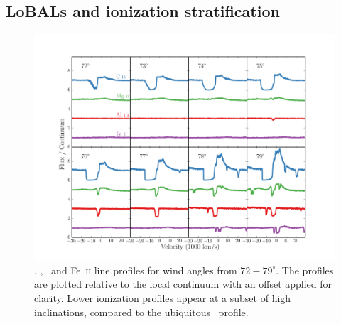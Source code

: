 \documentclass[useAMS,usenatbib]{mn2e_x}
\begin{document}



\subsection{LoBALs and ionization stratification}

\begin{figure} %
\centering
\includegraphics[width=1.0\textwidth]{figures/c4_angles.png}
\caption
{
\civ , \mg , \al\ and Fe~\textsc{ii} line profiles for wind angles
from $72-79^\circ$. The profiles are plotted relative to the local
continuum with an offset applied for clarity. Lower ionization
profiles appear at a subset of high inclinations, compared
to the ubiquitous \civ\ profile.
}
\label{fig:lobal}
\end{figure} %
\end{document}
